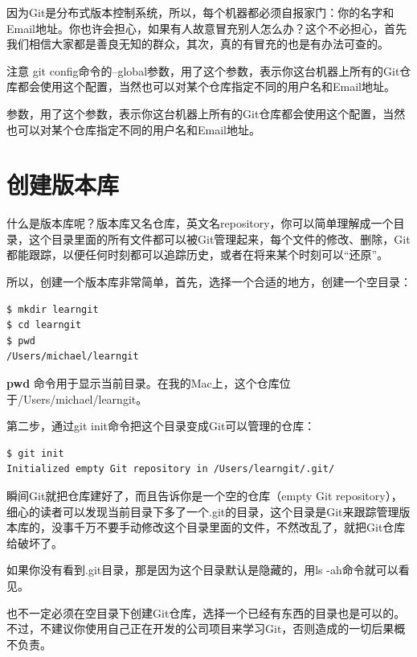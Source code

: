 \documentclass[•]{article}
\begin{document}
\begin{CJK}{UTF8}{gbsn}
\qquad 因为Git是分布式版本控制系统，所以，每个机器都必须自报家门：你的名字和Email地址。你也许会担心，如果有人故意冒充别人怎么办？这个不必担心，首先我们相信大家都是善良无知的群众，其次，真的有冒充的也是有办法可查的。

\qquad 注意{\color{red} git config}命令的{\color{red}--global}参数，用了这个参数，表示你这台机器上所有的Git仓库都会使用这个配置，当然也可以对某个仓库指定不同的用户名和Email地址。

\begin{shaded}
参数，用了这个参数，表示你这台机器上所有的Git仓库都会使用这个配置，当然也可以对某个仓库指定不同的用户名和Email地址。
\end{shaded}



\section{创建版本库}
\qquad 什么是版本库呢？版本库又名仓库，英文名repository，你可以简单理解成一个目录，这个目录里面的所有文件都可以被Git管理起来，每个文件的修改、删除，Git都能跟踪，以便任何时刻都可以追踪历史，或者在将来某个时刻可以“还原”。

\qquad 所以，创建一个版本库非常简单，首先，选择一个合适的地方，创建一个空目录：
\lstset{language=C}
\begin{lstlisting} 
$ mkdir learngit
$ cd learngit
$ pwd
/Users/michael/learngit
\end{lstlisting}
\qquad \textbf{\color{red}pwd} 命令用于显示当前目录。在我的Mac上，这个仓库位于/Users/michael/learngit。


\qquad 第二步，通过git init命令把这个目录变成Git可以管理的仓库：

\begin{lstlisting} 
$ git init
Initialized empty Git repository in /Users/learngit/.git/
\end{lstlisting}

\qquad 瞬间Git就把仓库建好了，而且告诉你是一个空的仓库（empty Git repository），细心的读者可以发现当前目录下多了一个.git的目录，这个目录是Git来跟踪管理版本库的，没事千万不要手动修改这个目录里面的文件，不然改乱了，就把Git仓库给破坏了。

\qquad 如果你没有看到.git目录，那是因为这个目录默认是隐藏的，用ls -ah命令就可以看见。

\qquad 也不一定必须在空目录下创建Git仓库，选择一个已经有东西的目录也是可以的。不过，不建议你使用自己正在开发的公司项目来学习Git，否则造成的一切后果概不负责。


\end{CJK}
\end{document}
